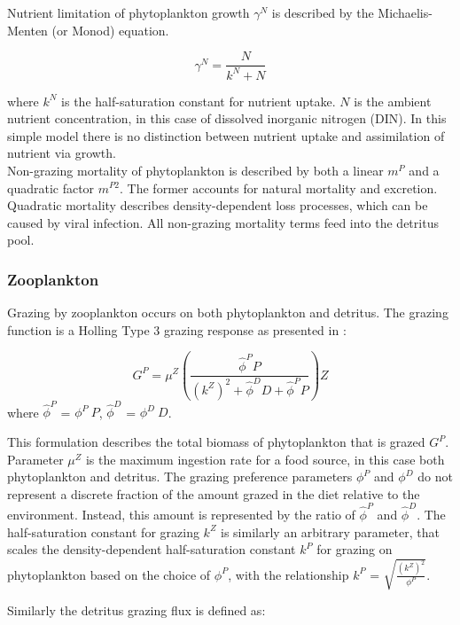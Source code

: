 \documentclass[template.tex]{subfiles}
\begin{document}
Nutrient limitation of phytoplankton growth $\gamma^N$ is described by the Michaelis-Menten (or Monod) equation.

\begin{equation}
    \gamma^N = \frac{N}{k^N + N}
\end{equation}

where $k^N$ is the half-saturation constant for nutrient uptake. $N$ is the ambient nutrient concentration, in this case of dissolved inorganic nitrogen (DIN). In this simple model there is no distinction between nutrient uptake and assimilation of nutrient via growth.\\

Non-grazing mortality of phytoplankton is described by both a linear $m^P$ and a quadratic factor $m^{P2}$. The former accounts for natural mortality and excretion. Quadratic mortality describes density-dependent loss processes, which can be caused by viral infection. All non-grazing mortality terms feed into the detritus pool.

\subsubsection{Zooplankton}
Grazing by zooplankton occurs on both phytoplankton and detritus. The grazing function is a Holling Type 3 grazing response as presented in \citet{Anderson2015c}:

\begin{equation}
    G^P = \mu^Z \left( \frac{ \hat{\phi}^P P}{(k^Z)^2 + \hat{\phi}^D D +\hat{\phi}^P P}  \right) Z
\end{equation}
where $\hat{\phi}^P$ = $\phi^P \ P$, $\hat{\phi}^D$ = $\phi^D \ D$.

This formulation describes the total biomass of phytoplankton that is grazed $G^P$. Parameter $\mu^Z$ is the maximum ingestion rate for a food source, in this case both phytoplankton and detritus. 
The grazing preference parameters $\phi^P$ and $\phi^D$ do not represent a discrete fraction of the amount grazed in the diet relative to the environment. Instead, this amount is represented by the ratio of $\hat{\phi}^P$ and $\hat{\phi}^D$. 
The half-saturation constant for grazing $k^Z$ is similarly an arbitrary parameter, that scales the density-dependent half-saturation constant $k^P$ for grazing on phytoplankton based on the choice of $\phi^P$, with the relationship $k^P$ = $\sqrt{\frac{(k^Z)^2 }{ \phi^P}}$.


Similarly the detritus grazing flux is defined as:
\end{document}
